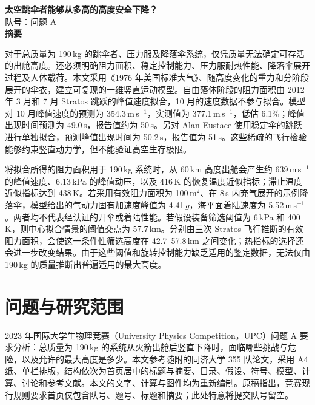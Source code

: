 \documentclass[11pt,a4paper]{article}
\begin{document}
\thispagestyle{empty}
\begin{center}
{\Large\bfseries 太空跳伞者能够从多高的高度安全下降？}\\[8pt]
{\normalsize 队号：\underline{\hspace{30mm}}\qquad 问题 A}\\[15pt]
{\large\bfseries 摘要}
\end{center}

对于总质量为 190\,kg 的跳伞者、压力服及降落伞系统，仅凭质量无法确定可存活的出舱高度。还必须明确阻力面积、稳定控制能力、压力服耐热性能、降落伞展开过程及人体载荷。本文采用《1976 年美国标准大气》、随高度变化的重力和分阶段展开的伞衣，建立可复现的一维竖直运动模型。自由落体阶段的阻力面积由 2012 年 3 月和 7 月 Stratos 跳跃的峰值速度拟合，10 月的速度数据不参与拟合。模型对 10 月峰值速度的预测为 354.3\,m\,s$^{-1}$，实测值为 377.1\,m\,s$^{-1}$，低估 6.1\%；峰值出现时间预测为 49.0\,s，报告值约为 50\,s。另对 Alan Eustace 使用稳定伞的跳跃进行单独拟合，预测峰值出现时间为 50.2\,s，报告值为 51\,s。这些稀疏的飞行检验能够约束竖直动力学，但不能验证高空生存极限。

将拟合所得的阻力面积用于 190\,kg 系统时，从 60\,km 高度出舱会产生约 639\,m\,s$^{-1}$ 的峰值速度、6.13\,kPa 的峰值动压，以及 416\,K 的恢复温度近似指标；滞止温度近似指标达到 438\,K。若采用有效阻力面积为 100\,m$^2$、在 8\,s 内充气展开的示例降落伞，模型给出的气动力固有加速度峰值为 4.41\,$g$，海平面着陆速度为 5.52\,m\,s$^{-1}$。两者均不代表经认证的开伞或着陆性能。若假设装备筛选阈值为 6\,kPa 和 400\,K，则中心拟合情景的阈值交点为 57.7\,km。分别由三次 Stratos 飞行推断的有效阻力面积，会使这一条件性筛选高度在 42.7--57.8\,km 之间变化；热指标的选择还会进一步改变结果。由于这些阈值和旋转控制能力缺乏适用的鉴定数据，无法仅由 190\,kg 的质量推断出普遍适用的最大高度。

\newpage
\tableofcontents
\newpage

\section{问题与研究范围}
2023 年国际大学生物理竞赛（University Physics Competition，UPC）问题 A 要求分析：总质量为 190\,kg 的系统从火箭出舱后竖直下降时，面临哪些挑战与危险，以及允许的最大高度是多少\cite{problem}。本文参考随附的同济大学 355 队论文，采用 A4 纸、单栏排版，结构依次为首页居中的标题与摘要、目录、假设、符号、模型、计算、讨论和参考文献\cite{tongji}。本文的文字、计算与图件均为重新编制。原稿指出，竞赛现行规则要求首页仅包含队号、题号、标题和摘要；此处特意将提交队号留空\cite{rules}。
\end{document}
